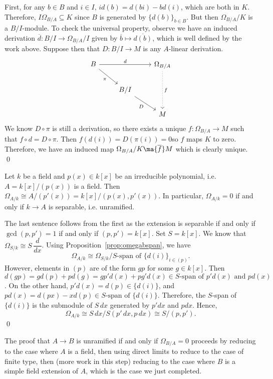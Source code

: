 \pf First, for any $b \in B$ and $i \in I$, $id(b)= d(bi) - bd(i)$, which are both in $K$. Therefore, $I \Omega_{B/A} \subseteq K$ since $B$ is generated by $\{d(b)\}_{b \in B}$. But then $\Omega_{B/A}/K$ is a $B/I$-module. To check the universal property, observe we have an induced derivation $\overline{d}: B/I \to \Omega_{B/A}/I$ given by $\overline{b} \mapsto \overline{d(b)}$, which is well defined by the work above. Suppose then that $D: B/I \to M$ is any $A$-linear derivation. 
	\[
	\begin{tikzcd}
	B \arrow[swap]{dr}{\pi} \arrow{rr}{d} & & \Omega_{B/A} \arrow[dotted]{dd}{f} \\
	&  B/I \arrow[swap]{dr}{D} & \\
	 & & M
	\end{tikzcd}
	\]
We know $D \circ \pi$ is still a derivation, so there exists a unique $f: \Omega_{B/A} \to M$ such that $f \circ d= D \circ \pi$. Then $f(d(i))= D(\pi(i))= 0$so $f$ maps $K$ to zero. Therefore, we have an induced map $\Omega_{B/A}/K \ma{\overline{f}} M$ which is clearly unique. \qed \\



\begin{prop}
Let $k$ be a field and $p(x) \in k[x]$ be an irreducible polynomial, i.e. $A= k[x]/(p(x))$ is a field. Then $\Omega_{A/k} \cong A/(p'(x))= k[x]/(p(x),p'(x))$. In particular, $\Omega_{A/k}=0$ if and only if $k \to A$ is separable, i.e. unramified. 
\end{prop}

\pf The last sentence follows from the first as the extension is separable if and only if $\gcd(p,p')=1$ if and only if $(p,p')= k[x]$. Set $S= k[x]$. We know that $\Omega_{S/k} \cong S \, \dfrac{d}{dx}$. Using Proposition~\ref{prop:omegabspan}, we have
	\[
	\Omega_{A/k} \cong \Omega_{S/k} / S\text{-span of }\{d(i)\}_{i \in (p)}.
	\]
However, elements in $(p)$ are of the form $gp$ for some $g \in k[x]$. Then $d(gp)= gd(p) + pd(g)= gp'd(x) + pg'd(x) \in S\text{-span of }p'd(x) \text{ and }pd(x)$. On the other hand, $p'd(x)=d(p) \in \{d(i)\}$, and $pd(x)= d(px) - xd(p) \in S\text{-span of } \{d(i)\}$. Therefore, the $S$-span of $\{d(i)\}$ is the submodule of $S \, dx$ generated by $p' dx$ and $p dx$. Hence,
	\[
	\Omega_{A/k} \cong S\,dx / S(p'\,dx,p\,dx) \cong S/(p,p').
	\]
\qed \\


\begin{rem}
The proof that $A \to B$ is unramified if and only if $\Omega_{B/A}=0$ proceeds by reducing to the case where $A$ is a field, then using direct limits to reduce to the case of finite type, then (more work in this step) reducing to the case where $B$ is a simple field extension of $A$, which is the case we just completed. 
\end{rem}



